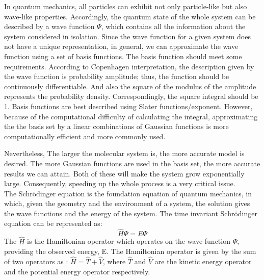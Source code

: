 \documentclass[twoside]{article}
\begin{document}
In quantum mechanics, all particles can exhibit not only particle-like but also wave-like properties. Accordingly, the quantum state of the whole system can be described by a wave function $\Psi$, which contains all the information about the system considered in isolation. Since the wave function for a given system does not have a unique representation, in general, we can approximate the wave function using a set of basis functions. The basis function should meet some requirements. According to Copenhagen interpretation, the description given by the wave function is probability amplitude; thus, the function should be continuously differentiable. And also the square of the modulus of the amplitude represents the probability density. Correspondingly, the square integral should be 1. Basis functions are best described using Slater functions/exponent. However, because of the computational difficulty of calculating the integral, approximating the the basis set by a linear combinations of Gaussian functions is more computationally efficient and more commonly used. 

Nevertheless, The larger the molecular system is, the more accurate model is desired. The more Gaussian functions are used in the basis set, the more accurate results we can attain. Both of these will make the system grow exponentially large. Consequently, speeding up the whole process is a very critical issue. \\






The Schrödinger equation is the foundation equation of quantum mechanics, in which, given the geometry and the environment of a system, the solution gives the wave functions and the energy of the system. 
The time invariant Schrödinger equation can be represented as:
\[
				\hat{H}\Psi = E\Psi
\]
The $\hat{H}$ is the Hamiltonian operator which operates on the wave-function $\Psi$, providing the observed energy, E. The Hamiltonian operator is given by the sum of two operators as : $\hat{H} = \hat{T} + \hat{V}$,  where $\hat{T}$ and $\hat{V}$ are the kinetic energy operator and the potential energy operator respectively.
\end{document}
